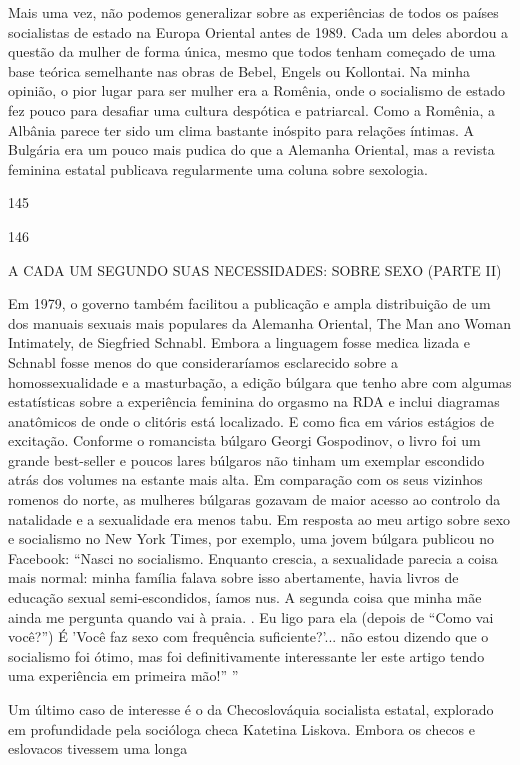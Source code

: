  \par 
Mais uma vez, não podemos generalizar sobre as experiências de todos os países socialistas de estado na Europa Oriental antes de 1989. Cada um deles abordou a questão da mulher de forma única, mesmo que todos tenham começado de uma base teórica semelhante nas obras de Bebel, Engels ou Kollontai. Na minha opinião, o pior lugar para ser mulher era a Romênia, onde o socialismo de estado fez pouco para desafiar uma cultura despótica e patriarcal. Como a Romênia, a Albânia parece ter sido um clima bastante inóspito para relações íntimas. A Bulgária era um pouco mais pudica do que a Alemanha Oriental, mas a revista feminina estatal publicava regularmente uma coluna sobre sexologia.
 \par 
145
 \par 
146
 \par 
A CADA UM SEGUNDO SUAS NECESSIDADES: SOBRE SEXO (PARTE II)
 \par 
Em 1979, o governo também facilitou a publicação e ampla distribuição de um dos manuais sexuais mais populares da Alemanha Oriental, The Man ano Woman Intimately, de Siegfried Schnabl. Embora a linguagem fosse medica lizada e Schnabl fosse menos do que consideraríamos esclarecido sobre a homossexualidade e a masturbação, a edição búlgara que tenho abre com algumas estatísticas sobre a experiência feminina do orgasmo na RDA e inclui diagramas anatômicos de onde o clitóris está localizado. E como fica em vários estágios de excitação. Conforme o romancista búlgaro Georgi Gospodinov, o livro foi um grande best-seller e poucos lares búlgaros não tinham um exemplar escondido atrás dos volumes na estante mais alta. Em comparação com os seus vizinhos romenos do norte, as mulheres búlgaras gozavam de maior acesso ao controlo da natalidade e a sexualidade era menos tabu. Em resposta ao meu artigo sobre sexo e socialismo no New York Times, por exemplo, uma jovem búlgara publicou no Facebook: “Nasci no socialismo. Enquanto crescia, a sexualidade parecia a coisa mais normal: minha família falava sobre isso abertamente, havia livros de educação sexual semi-escondidos, íamos nus. A segunda coisa que minha mãe ainda me pergunta quando vai à praia. . Eu ligo para ela (depois de “Como vai você?”) É 'Você faz sexo com frequência suficiente?'... não estou dizendo que o socialismo foi ótimo, mas foi definitivamente interessante ler este artigo tendo uma experiência em primeira mão!” ”
 \par 
Um último caso de interesse é o da Checoslováquia socialista estatal, explorado em profundidade pela socióloga checa Katetina Liskova. Embora os checos e eslovacos tivessem uma longa
